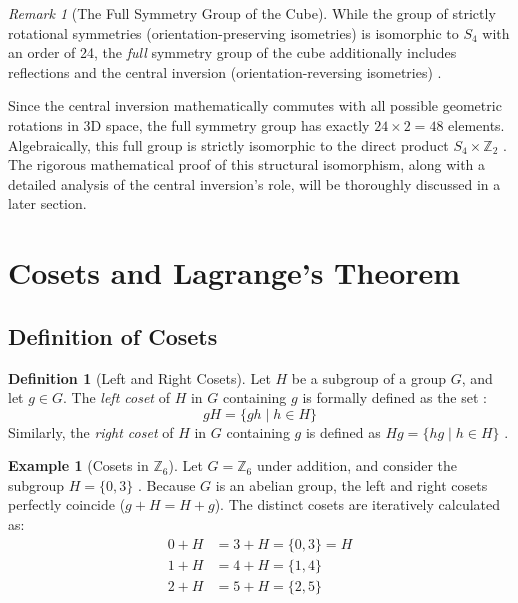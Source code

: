 \documentclass[11pt]{article}
\theoremstyle{definition}
\newtheorem{definition}{Definition}[section]
\newtheorem{example}{Example}[section]
\theoremstyle{plain}
\theoremstyle{remark}
\newtheorem*{remark}{Remark}
\begin{document}
\begin{remark}[The Full Symmetry Group of the Cube]
While the group of strictly rotational symmetries (orientation-preserving isometries) is isomorphic to $S_4$ with an order of 24, the \emph{full} symmetry group of the cube additionally includes reflections and the central inversion (orientation-reversing isometries) \cite{dummit}. 

Since the central inversion mathematically commutes with all possible geometric rotations in 3D space, the full symmetry group has exactly $24 \times 2 = 48$ elements. Algebraically, this full group is strictly isomorphic to the direct product $S_4 \times \mathbb{Z}_2$ \cite{gallian}. The rigorous mathematical proof of this structural isomorphism, along with a detailed analysis of the central inversion's role, will be thoroughly discussed in a later section.
\end{remark}

\section{Cosets and Lagrange's Theorem}

\subsection{Definition of Cosets}

\begin{definition}[Left and Right Cosets]
Let $H$ be a subgroup of a group $G$, and let $g \in G$. The \emph{left coset} of $H$ in $G$ containing $g$ is formally defined as the set \cite{fraleigh}:
\begin{equation}
    gH = \{gh \mid h \in H\}
\end{equation}
Similarly, the \emph{right coset} of $H$ in $G$ containing $g$ is defined as $Hg = \{hg \mid h \in H\}$ \cite{dummit}.
\end{definition}

\begin{example}[Cosets in $\mathbb{Z}_6$]
Let $G = \mathbb{Z}_6$ under addition, and consider the subgroup $H = \{0, 3\}$ \cite{gallian}. Because $G$ is an abelian group, the left and right cosets perfectly coincide ($g+H = H+g$). The distinct cosets are iteratively calculated as:
\begin{align}
    0 + H &= 3 + H = \{0, 3\} = H \\
    1 + H &= 4 + H = \{1, 4\} \\
    2 + H &= 5 + H = \{2, 5\}
\end{align}
\end{example}
\end{document}
